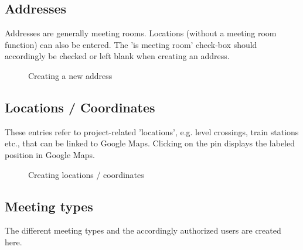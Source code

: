 \subsection{Addresses}

Addresses are generally meeting rooms. Locations (without a meeting room function) can also be entered. The 'is meeting room' check-box should accordingly be checked or left blank when creating an address. 

\begin{figure}[H]
\caption{Creating a new address}
\end{figure}

\subsection{Locations / Coordinates}

These entries refer to project-related 'locations', e.g. level crossings, train stations etc., that can be linked to Google Maps. Clicking on the pin displays the labeled position in Google Maps.

\begin{figure}[H]
\caption{Creating locations / coordinates}
\end{figure}

\clearpage
\subsection{Meeting types}

The different meeting types and the accordingly authorized users are created here.


